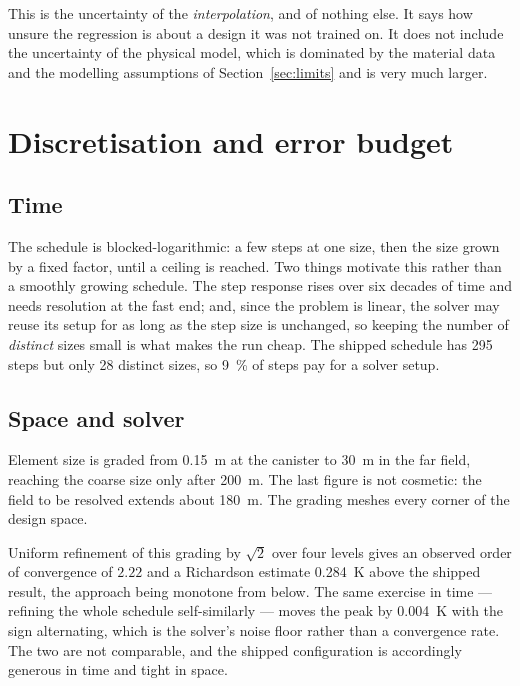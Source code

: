 \documentclass[11pt,a4paper]{article}
\theoremstyle{plain}
\begin{document}
This is the uncertainty of the \emph{interpolation}, and of nothing else. It
says how unsure the regression is about a design it was not trained on. It does
not include the uncertainty of the physical model, which is dominated by the
material data and the modelling assumptions of Section~\ref{sec:limits} and is
very much larger.

\section{Discretisation and error budget}

\subsection{Time}

The schedule is blocked-logarithmic: a few steps at one size, then the size
grown by a fixed factor, until a ceiling is reached. Two things motivate this
rather than a smoothly growing schedule. The step response rises over six
decades of time and needs resolution at the fast end; and, since the problem is
linear, the solver may reuse its setup for as long as the step size is
unchanged, so keeping the number of \emph{distinct} sizes small is what makes
the run cheap. The shipped schedule has 295 steps but only 28 distinct sizes,
so \SI{9}{\percent} of steps pay for a solver setup.

\subsection{Space and solver}

Element size is graded from \SI{0.15}{\metre} at the canister to
\SI{30}{\metre} in the far field, reaching the coarse size only after
\SI{200}{\metre}. The last figure is not cosmetic: the field to be resolved
extends about \SI{180}{\metre}. The grading meshes every corner of the design
space.

Uniform refinement of this grading by $\sqrt{2}$ over four levels gives an
observed order of convergence of $2.22$ and a Richardson estimate
\SI{0.284}{\kelvin} above the shipped result, the approach being monotone from
below. The same exercise in time --- refining the whole schedule
self-similarly --- moves the peak by \SI{0.004}{\kelvin} with the sign
alternating, which is the solver's noise floor rather than a convergence rate.
The two are not comparable, and the shipped configuration is accordingly
generous in time and tight in space.
\end{document}
